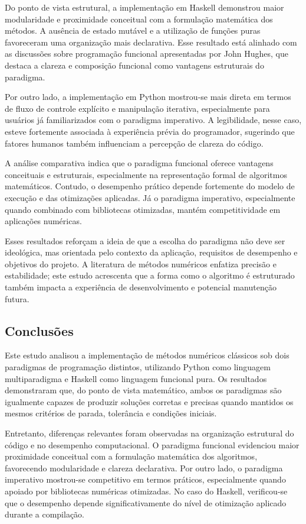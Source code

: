 Do ponto de vista estrutural, a implementação em Haskell demonstrou maior
modularidade e proximidade conceitual com a formulação matemática dos métodos.
A ausência de estado mutável e a utilização de funções puras favoreceram uma
organização mais declarativa. Esse resultado está alinhado com as discussões
sobre programação funcional apresentadas por John Hughes, que destaca a
clareza e composição funcional como vantagens estruturais do paradigma.

Por outro lado, a implementação em Python mostrou-se mais direta em termos de
fluxo de controle explícito e manipulação iterativa, especialmente para
usuários já familiarizados com o paradigma imperativo. A legibilidade, nesse
caso, esteve fortemente associada à experiência prévia do programador,
sugerindo que fatores humanos também influenciam a percepção de clareza do
código.

A análise comparativa indica que o paradigma funcional oferece vantagens
conceituais e estruturais, especialmente na representação formal de algoritmos
matemáticos. Contudo, o desempenho prático depende fortemente do modelo de
execução e das otimizações aplicadas. Já o paradigma imperativo, especialmente
quando combinado com bibliotecas otimizadas, mantém competitividade em
aplicações numéricas.

Esses resultados reforçam a ideia de que a escolha do paradigma não deve ser
ideológica, mas orientada pelo contexto da aplicação, requisitos de desempenho
e objetivos do projeto. A literatura de métodos numéricos enfatiza precisão e
estabilidade; este estudo acrescenta que a forma como o algoritmo é estruturado
também impacta a experiência de desenvolvimento e potencial manutenção futura.


\subsection{Conclusões}

Este estudo analisou a implementação de métodos numéricos clássicos sob dois
paradigmas de programação distintos, utilizando Python como linguagem
multiparadigma e Haskell como linguagem funcional pura. Os resultados
demonstraram que, do ponto de vista matemático, ambos os paradigmas são
igualmente capazes de produzir soluções corretas e precisas quando mantidos os
mesmos critérios de parada, tolerância e condições iniciais.

Entretanto, diferenças relevantes foram observadas na organização estrutural
do código e no desempenho computacional. O paradigma funcional evidenciou maior
proximidade conceitual com a formulação matemática dos algoritmos, favorecendo
modularidade e clareza declarativa. Por outro lado, o paradigma imperativo
mostrou-se competitivo em termos práticos, especialmente quando apoiado por
bibliotecas numéricas otimizadas. No caso do Haskell, verificou-se que o
desempenho depende significativamente do nível de otimização aplicado durante a
compilação.

